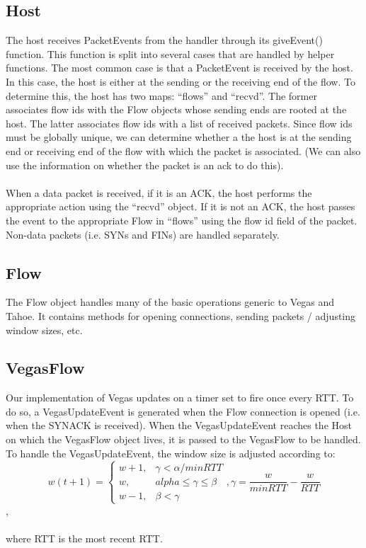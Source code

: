\documentclass[12pt]{article}
\begin{document}
\subsection{Host}
The host receives PacketEvents from the handler through its giveEvent() function.  This function is split into several cases that are handled by helper functions.  The most common case is that a PacketEvent is received by the host.  In this case, the host is either at the sending or the receiving end of the flow.  To determine this, the host has two maps: ``flows'' and ``recvd''.  The former associates flow ids with the Flow objects whose sending ends are rooted at the host.  The latter associates flow ids with a list of received packets.  Since flow ids must be globally unique, we can determine whether a the host is at the sending end or receiving end of the flow with which the packet is associated.  (We can also use the information on whether the packet is an ack to do this).
\\\\
When a data packet is received, if it is an ACK, the host performs the appropriate action using the ``recvd'' object.  If it is not an ACK, the host passes the event to the appropriate Flow in ``flows'' using the flow id field of the packet.  Non-data packets (i.e. SYNs and FINs) are handled separately.

\subsection{Flow}
The Flow object handles many of the basic operations generic to Vegas and Tahoe.  It contains methods for opening connections, sending packets / adjusting window sizes, etc.

\subsection{VegasFlow}
Our implementation of Vegas updates on a timer set to fire once every RTT.  To do so, a VegasUpdateEvent is generated when the Flow connection is opened (i.e. when the SYNACK is received).  When the VegasUpdateEvent reaches the Host on which the VegasFlow object lives, it is passed to the VegasFlow to be handled.  To handle the VegasUpdateEvent, the window size is adjusted according to:
$$ w(t + 1) = \begin{cases} w + 1, & \gamma < \alpha / minRTT \\ w, & alpha \le \gamma \le \beta \\ w - 1, & \beta < \gamma \end{cases}, \gamma = \dfrac{w}{minRTT} - \dfrac{w}{RTT} $$,
\\\\
where RTT is the most recent RTT.
\end{document}
